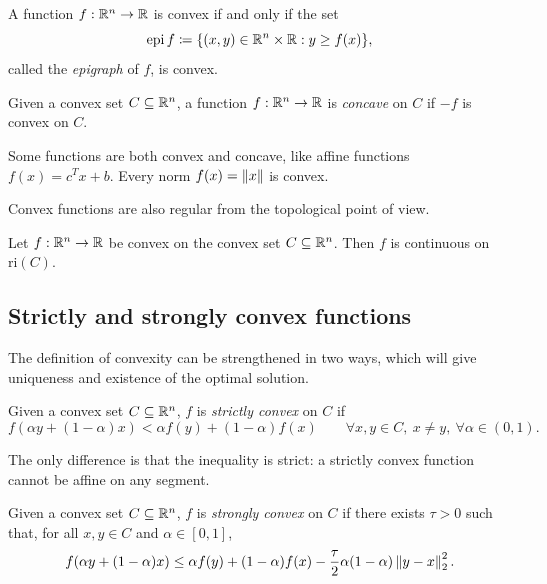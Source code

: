 \begin{theorem}
A function $f:\mathbb{R}^n \to \mathbb{R}$ is convex if and only if the set
\[
    \mathrm{epi}\, f \coloneqq \{(x,y) \in \mathbb{R}^{n} \times \mathbb{R} : y \ge f(x)\},
\]
called the \emph{epigraph} of $f$, is convex.
\end{theorem}

\begin{definition}
Given a convex set $C \subseteq \mathbb{R}^n$, a function $f:\mathbb{R}^n \to \mathbb{R}$ is \emph{concave} on $C$ if $-f$ is convex on $C$.
\end{definition}

Some functions are both convex and concave, like affine functions $f(x) = c^Tx + b$. Every norm $f(x) = \left\lVert x \right\rVert$ is convex.

Convex functions are also regular from the topological point of view.

\begin{theorem}
Let $f:\mathbb{R}^n \to \mathbb{R}$ be convex on the convex set $C \subseteq \mathbb{R}^n$. Then $f$ is continuous on $\mathrm{ri}(C)$.
\end{theorem}

\subsection{Strictly and strongly convex functions}

The definition of convexity can be strengthened in two ways, which will give uniqueness and existence of the optimal solution.

\begin{definition}
Given a convex set $C \subseteq \mathbb{R}^n$, $f$ is \emph{strictly convex} on $C$ if
\[
    f(\alpha y + (1-\alpha)x) < \alpha f(y) + (1-\alpha)f(x) \qquad \forall x,y \in C,\ x \ne y,\ \forall \alpha \in (0,1).
\]
\end{definition}

The only difference is that the inequality is strict: a strictly convex function cannot be affine on any segment.

\begin{definition}
Given a convex set $C \subseteq \mathbb{R}^n$, $f$ is \emph{strongly convex} on $C$ if there exists $\tau > 0$ such that, for all $x, y \in C$ and $\alpha \in [0,1]$,
\[
    f(\alpha y + (1-\alpha)x) \le \alpha f(y) + (1-\alpha)f(x) - \frac{\tau}{2}\alpha(1-\alpha)\left\lVert y-x \right\rVert_2^2.
\]
\end{definition}

